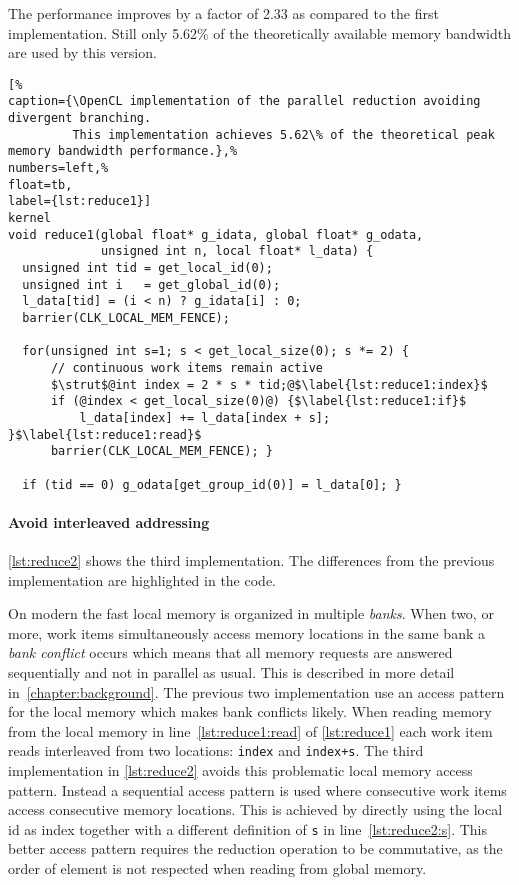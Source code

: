 The performance improves by a factor of 2.33 as compared to the first implementation.
Still only 5.62\% of the theoretically available memory bandwidth are used by this version.

\begin{lstlisting}[%                                                             
caption={\OpenCL implementation of the parallel reduction avoiding divergent branching.
         This implementation achieves 5.62\% of the theoretical peak memory bandwidth performance.},%
numbers=left,%
float=tb,
label={lst:reduce1}]
kernel
void reduce1(global float* g_idata, global float* g_odata,
             unsigned int n, local float* l_data) {
  unsigned int tid = get_local_id(0);
  unsigned int i   = get_global_id(0);
  l_data[tid] = (i < n) ? g_idata[i] : 0;
  barrier(CLK_LOCAL_MEM_FENCE);

  for(unsigned int s=1; s < get_local_size(0); s *= 2) {
      // continuous work items remain active
      $\strut$@int index = 2 * s * tid;@$\label{lst:reduce1:index}$
      if (@index < get_local_size(0)@) {$\label{lst:reduce1:if}$
          l_data[index] += l_data[index + s]; }$\label{lst:reduce1:read}$
      barrier(CLK_LOCAL_MEM_FENCE); }

  if (tid == 0) g_odata[get_group_id(0)] = l_data[0]; }
\end{lstlisting}


\paragraph{Avoid interleaved addressing}

\autoref{lst:reduce2} shows the third implementation.
The differences from the previous implementation are highlighted in the code.

On modern \GPUs the fast local memory is organized in multiple \emph{banks}.
When two, or more, work items simultaneously access memory locations in the same bank a \emph{bank conflict} occurs which means that all memory requests are answered sequentially and not in parallel as usual.
This is described in more detail in~\autoref{chapter:background}.
The previous two implementation use an access pattern for the local memory which makes bank conflicts likely.
When reading memory from the local memory in line~\ref{lst:reduce1:read} of \autoref{lst:reduce1} each work item reads interleaved from two locations: \lstinline!index! and \lstinline!index+s!.
The third implementation in \autoref{lst:reduce2} avoids this problematic local memory access pattern.
Instead a sequential access pattern is used where consecutive work items access consecutive memory locations.
This is achieved by directly using the local id as index together with a different definition of \lstinline!s! in line~\ref{lst:reduce2:s}.
This better access pattern requires the reduction operation to be commutative, as the order of element is not respected when reading from global memory.


